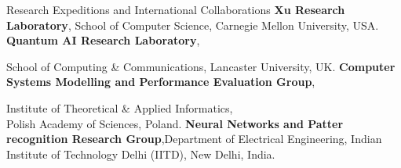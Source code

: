\begin{rubric}{Research Expeditions and International Collaborations}
 \textbf{Xu Research Laboratory}, School of Computer Science, Carnegie Mellon University, USA.
 \textbf{Quantum AI Research Laboratory}, 
\par School of Computing \& Communications, Lancaster University, UK.
 \textbf{Computer Systems Modelling and Performance Evaluation Group}, 
\par Institute of Theoretical \& Applied Informatics, \\Polish Academy of Sciences, Poland.
 \textbf{Neural Networks and Patter recognition Research Group},Department of Electrical Engineering, Indian Institute of Technology Delhi (IITD), New Delhi, India.
\end{rubric}